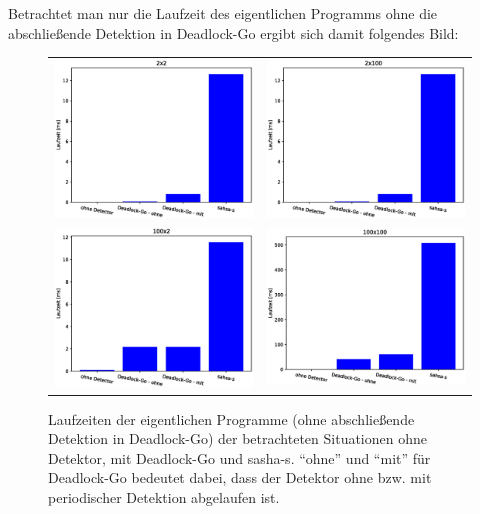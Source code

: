 Betrachtet man nur die Laufzeit des eigentlichen Programms ohne die abschließende 
Detektion in Deadlock-Go ergibt sich damit folgendes Bild:
\begin{figure}[H]
    \begin{tabular}{cc}
        \includegraphics[width=.47\textwidth]{img/2x2_runtime.eps} & \includegraphics[width=.47\textwidth]{img/2x100_runtime.eps}\\
        \includegraphics[width=.47\textwidth]{img/100x2_runtime.eps} & \includegraphics[width=.47\textwidth]{img/100x100_runtime.eps}\\
    \end{tabular}
    \caption{Laufzeiten der eigentlichen Programme (ohne abschließende Detektion 
    in Deadlock-Go) der betrachteten Situationen ohne Detektor, mit Deadlock-Go und sasha-s. ``ohne'' und ``mit''
    für Deadlock-Go bedeutet dabei, dass der Detektor ohne bzw. mit periodischer 
    Detektion abgelaufen ist.}
\end{figure}
